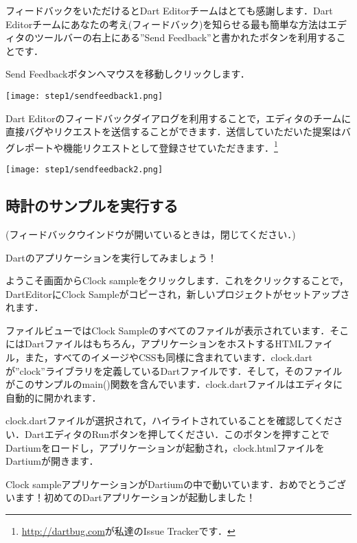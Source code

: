 フィードバックをいただけるとDart Editorチームはとても感謝します．Dart Editorチームにあなたの考え(フィードバック)を知らせる最も簡単な方法はエディタのツールバーの右上にある''Send Feedback''と書かれたボタンを利用することです．

Send Feedbackボタンへマウスを移動しクリックします．

\texttt{[image: step1/sendfeedback1.png]}

Dart Editorのフィードバックダイアログを利用することで，エディタのチームに直接バグやリクエストを送信することができます．送信していただいた提案はバグレポートや機能リクエストとして登録させていただきます．\footnote{\url{http://dartbug.com}が私達のIssue Trackerです．}

\texttt{[image: step1/sendfeedback2.png]}

\subsection{時計のサンプルを実行する}

(フィードバックウインドウが開いているときは，閉じてください．)

Dartのアプリケーションを実行してみましょう！

ようこそ画面からClock sampleをクリックします．これをクリックすることで，DartEditorにClock Sampleがコピーされ，新しいプロジェクトがセットアップされます．




ファイルビューではClock Sampleのすべてのファイルが表示されています．そこにはDartファイルはもちろん，アプリケーションをホストするHTMLファイル，また，すべてのイメージやCSSも同様に含まれています．clock.dartが''clock''ライブラリを定義しているDartファイルです．そして，そのファイルがこのサンプルのmain()関数を含んでいます．clock.dartファイルはエディタに自動的に開かれます．


clock.dartファイルが選択されて，ハイライトされていることを確認してください．DartエディタのRunボタンを押してください．このボタンを押すことでDartiumをロードし，アプリケーションが起動され，clock.htmlファイルをDartiumが開きます．


Clock sampleアプリケーションがDartiumの中で動いています．おめでとうございます！初めてのDartアプリケーションが起動しました！

